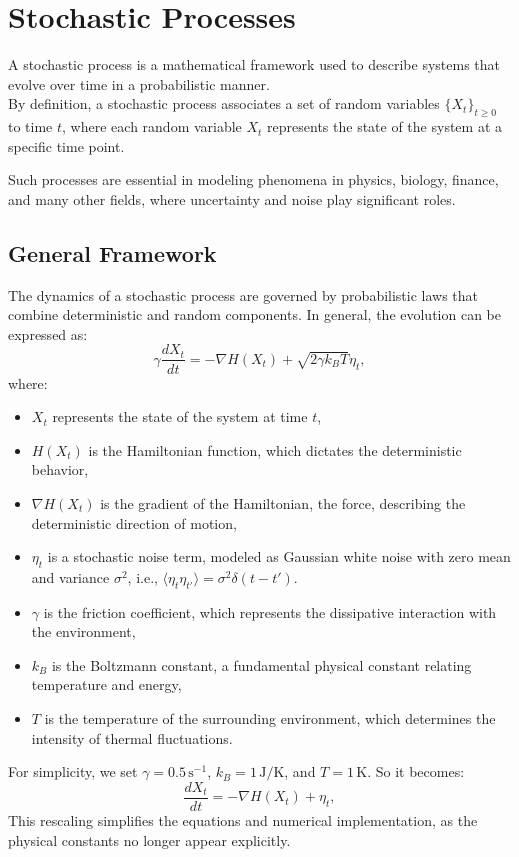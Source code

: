 \documentclass[English, Lau, oneside]{sapthesis}
\begin{document}
\chapter{Stochastic Processes}  \label{chap:stochastic_processes}
A stochastic process is a mathematical framework used to describe systems that evolve over time in a probabilistic manner.\\
By definition, a stochastic process associates a set of random variables \( \{X_t\}_{t \geq 0} \) to time \( t \), where each random variable \( X_t \) represents the state of the system at a specific time point. 

Such processes are essential in modeling phenomena in physics, biology, finance, and many other fields, where uncertainty and noise play significant roles.
\section{General Framework}
\noindent The dynamics of a stochastic process are governed by probabilistic laws that combine deterministic and random components. In general, the evolution can be expressed as:
\begin{equation}
    \gamma\frac{dX_t}{dt} = -\nabla H(X_t) + \sqrt{2 \gamma k_B T} \eta_t,
\end{equation}
where:
\begin{itemize}
    \item \( X_t \) represents the state of the system at time \( t \),
    \item \( H(X_t) \) is the Hamiltonian function, which dictates the deterministic behavior,
    \item \( \nabla H(X_t) \) is the gradient of the Hamiltonian, the force, describing the deterministic direction of motion,
    \item \( \eta_t \) is a stochastic noise term, modeled as Gaussian white noise with zero mean and variance \( \sigma^2 \), i.e., \( \langle \eta_t \eta_{t'} \rangle = \sigma^2 \delta(t-t') \).
    \item \( \gamma \) is the friction coefficient, which represents the dissipative interaction with the environment,
    \item \( k_B \) is the Boltzmann constant, a fundamental physical constant relating temperature and energy,
    \item \( T \) is the temperature of the surrounding environment, which determines the intensity of thermal fluctuations.

\end{itemize}
For simplicity, we set \( \gamma = 0.5 \, \text{s}^{-1} \), \( k_B = 1 \, \text{J/K} \), and \( T = 1 \, \text{K} \).
So it becomes:
\begin{equation}
    \frac{dX_t}{dt} = -\nabla H(X_t) + \eta_t,
\end{equation}
This rescaling simplifies the equations and numerical implementation, as the physical constants no longer appear explicitly.
\end{document}
